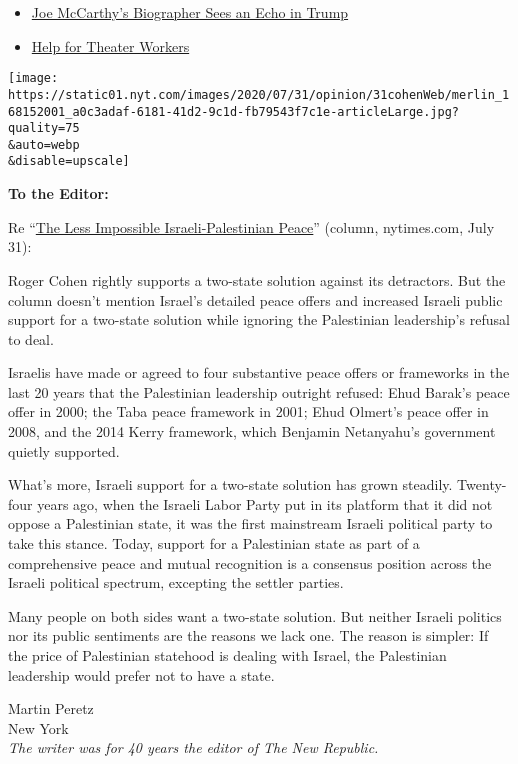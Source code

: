 \begin{itemize}
\tightlist
\item
  \protect\hyperlink{link-1ec0a03a}{Joe McCarthy's Biographer Sees an
  Echo in Trump}
\item
  \protect\hyperlink{link-64e228fc}{Help for Theater Workers}
\end{itemize}

\texttt{[image: https://static01.nyt.com/images/2020/07/31/opinion/31cohenWeb/merlin\_168152001\_a0c3adaf-6181-41d2-9c1d-fb79543f7c1e-articleLarge.jpg?quality=75\\\&auto=webp\\\&disable=upscale]}

\textbf{To the Editor:}

Re
``\href{https://www.nytimes.com/2020/07/31/opinion/israeli-palestinian-peace.html}{The
Less Impossible Israeli-Palestinian Peace}'' (column, nytimes.com, July
31):

Roger Cohen rightly supports a two-state solution against its
detractors. But the column doesn't mention Israel's detailed peace
offers and increased Israeli public support for a two-state solution
while ignoring the Palestinian leadership's refusal to deal.

Israelis have made or agreed to four substantive peace offers or
frameworks in the last 20 years that the Palestinian leadership outright
refused: Ehud Barak's peace offer in 2000; the Taba peace framework in
2001; Ehud Olmert's peace offer in 2008, and the 2014 Kerry framework,
which Benjamin Netanyahu's government quietly supported.

What's more, Israeli support for a two-state solution has grown
steadily. Twenty-four years ago, when the Israeli Labor Party put in its
platform that it did not oppose a Palestinian state, it was the first
mainstream Israeli political party to take this stance. Today, support
for a Palestinian state as part of a comprehensive peace and mutual
recognition is a consensus position across the Israeli political
spectrum, excepting the settler parties.

Many people on both sides want a two-state solution. But neither Israeli
politics nor its public sentiments are the reasons we lack one. The
reason is simpler: If the price of Palestinian statehood is dealing with
Israel, the Palestinian leadership would prefer not to have a state.

Martin Peretz\\
New York\\
\emph{The writer was for 40 years the editor of The New Republic.}

